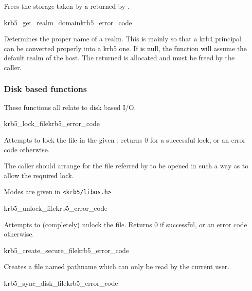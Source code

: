 Frees the storage taken by a  returned by
.

\begin{funcdecl}{krb5_get_realm_domain}{krb5_error_code}{\funcinout}
\funcin
{}
\funcout
{}
\end{funcdecl}

Determines the proper name of a realm. This is mainly so that a krb4
principal can be converted properly into a krb5 one. If
 is null, the function will assume the default realm of
the host. The returned  is allocated and must be
freed by the caller. 

\subsubsection{Disk based functions}
These functions all relate to disk based I/O.

\begin{funcdecl}{krb5_lock_file}{krb5_error_code}{\funcin}
\end{funcdecl}

Attempts to lock the file in the given ; returns 0 for a
successful lock, or an error code otherwise.

The caller should arrange for the file referred by  to be
opened in such a way as to allow the required lock.

Modes are given in {\tt <krb5/libos.h>}

\begin{funcdecl}{krb5_unlock_file}{krb5_error_code}{\funcin}
\end{funcdecl}

Attempts to (completely) unlock the file.  Returns 0 if successful,
or an error code otherwise.


\begin{funcdecl}{krb5_create_secure_file}{krb5_error_code}{\funcin}
\end{funcdecl}

Creates a file named pathname which can only be read by the current
user.

\begin{funcdecl}{krb5_sync_disk_file}{krb5_error_code}{\funcin}
\end{funcdecl}

